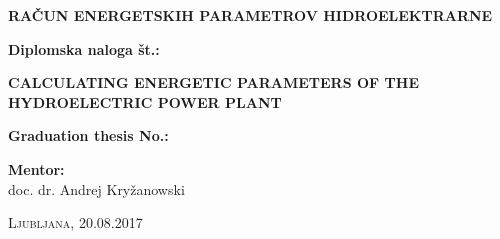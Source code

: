 \begin{minipage}{\textwidth}
\begin{center}
\vspace*{2cm}

\begin{Large}
\textbf{RAČUN ENERGETSKIH PARAMETROV HIDROELEKTRARNE}
\end{Large}

\vspace*{0.5cm}

\begin{large}
\textbf{Diplomska naloga št.:}
\end{large}

\vspace*{1.5cm}

\begin{Large}
	\textbf{CALCULATING ENERGETIC PARAMETERS OF THE HYDROELECTRIC POWER PLANT}
\end{Large}

\vspace*{0.5cm}

\begin{large}
	\textbf{Graduation thesis No.:}
\end{large}



\end{center}
\vspace*{8cm}


\begin{large}
	\textbf{Mentor:}\\
	doc. dr. Andrej Kryžanowski \\
\end{large}

\begin{center}
\textsc{Ljubljana, 20.08.2017}
\end{center}

\end{minipage}

\newpage
\thispagestyle{empty}
\cleardoublepage